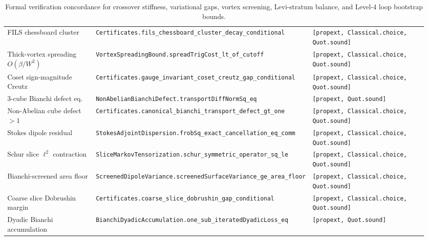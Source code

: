 \documentclass[11pt,a4paper]{article}
\begin{document}
\begin{table}[ht]
\begin{tabular}{@{}p{4.3cm}p{6.6cm}p{3.4cm}@{}}
FILS chessboard cluster & \texttt{Certificates.}\newline\texttt{fils\_chessboard\_cluster\_decay\_conditional} & \texttt{[propext, Classical.choice,} \texttt{Quot.sound]} \\
Thick-vortex spreading $O(\beta/W^2)$ & \texttt{VortexSpreadingBound.}\newline\texttt{spreadTrigCost\_lt\_of\_cutoff} & \texttt{[propext, Classical.choice,} \texttt{Quot.sound]} \\
Coset sign-magnitude Creutz & \texttt{Certificates.}\newline\texttt{gauge\_invariant\_coset\_creutz\_gap\_conditional} & \texttt{[propext, Classical.choice,} \texttt{Quot.sound]} \\
3-cube Bianchi defect eq. & \texttt{NonAbelianBianchiDefect.}\newline\texttt{transportDiffNormSq\_eq} & \texttt{[propext, Quot.sound]} \\
Non-Abelian cube defect $> 1$ & \texttt{Certificates.}\newline\texttt{canonical\_bianchi\_transport\_defect\_gt\_one} & \texttt{[propext, Classical.choice,} \texttt{Quot.sound]} \\
Stokes dipole residual & \texttt{StokesAdjointDispersion.}\newline\texttt{frobSq\_exact\_cancellation\_eq\_comm} & \texttt{[propext, Classical.choice,} \texttt{Quot.sound]} \\
Schur slice $\ell^2$ contraction & \texttt{SliceMarkovTensorization.}\newline\texttt{schur\_symmetric\_operator\_sq\_le} & \texttt{[propext, Classical.choice,} \texttt{Quot.sound]} \\
Bianchi-screened area floor & \texttt{ScreenedDipoleVariance.}\newline\texttt{screenedSurfaceVariance\_ge\_area\_floor} & \texttt{[propext, Classical.choice,} \texttt{Quot.sound]} \\
Coarse slice Dobrushin margin & \texttt{Certificates.}\newline\texttt{coarse\_slice\_dobrushin\_gap\_conditional} & \texttt{[propext, Classical.choice,} \texttt{Quot.sound]} \\
Dyadic Bianchi accumulation & \texttt{BianchiDyadicAccumulation.}\newline\texttt{one\_sub\_iteratedDyadicLoss\_eq} & \texttt{[propext, Quot.sound]} \\
\bottomrule
\end{tabular}
\caption{Formal verification concordance for crossover stiffness, variational gaps, vortex screening, Levi-stratum balance, and Level-4 loop bootstrap bounds.}
\label{tab:paper4-concordance}
\end{table}



\end{document}
